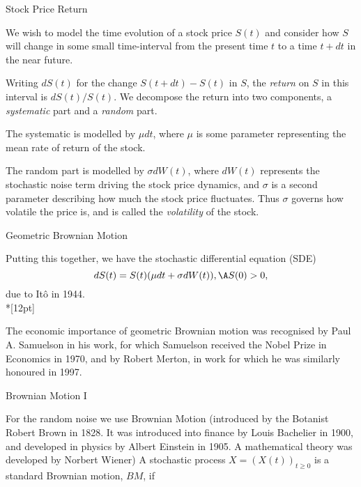 {Stock Price Return}






	We wish to model the time evolution of a stock price
$S(t)$ and consider how $S$
will change in some small time-interval from the present time $t$
to a time $t+dt$ in the near future.


	Writing $dS(t)$ for the
change $S(t+dt)-S(t)$ in $S$, the {\it return} on $S$ in this
interval is $dS(t)/S(t)$.
We decompose the return into two components, a {\it systematic}
part and a {\it random} part.


	The systematic is modelled by $\mu dt$, where $\mu$ is some parameter
representing the mean rate of return of the stock.


	
The random part is modelled by $\sigma dW(t)$, where $dW(t)$
represents the stochastic noise term driving the stock price dynamics, and
$\sigma$ is a second parameter describing how much the stock price fluctuates. Thus $\sigma$
governs how volatile the price is, and is called the {\it
volatility} of the
stock.





{Geometric Brownian Motion}

Putting this together, we have the stochastic differential
equation (SDE)
\begin{equation}\label{GBM}
dS(t) = S(t) (\mu dt + \sigma dW(t)), \A S(0) > 0,
\end{equation}
due to It\^{o} in 1944.\\*[12pt]

The economic importance of geometric
Brownian motion was recognised by Paul A. Samuelson in his work, for which Samuelson received the Nobel
Prize in Economics in 1970, and by Robert Merton, in work for which he was similarly
honoured in 1997.

{Brownian Motion I}






	For the random noise we use Brownian Motion (introduced by the Botanist Robert Brown in
1828. It was introduced into finance by Louis Bachelier in 1900, and developed in physics by Albert Einstein in 1905.
A mathematical theory was developed by Norbert Wiener)
A stochastic process $X=(X(t))_{t \geq 0}$ is a standard
Brownian motion, $BM$, if


